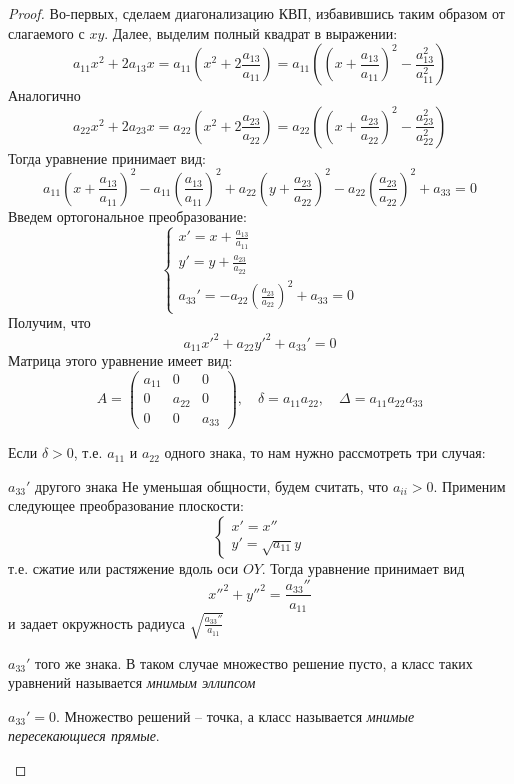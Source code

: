 \begin{proof}
	Во-первых, сделаем диагонализацию КВП, избавившись таким образом от слагаемого с $xy$.
	Далее, выделим полный квадрат в выражении:
	\[a_{11} x^2 + 2a_{13} x = a_{11} \left(x^2 + 2 \frac{a_{13}}{a_{11}}\right) = a_{11} \left(\left(x + \frac{a_{13}}{a_{11}}\right)^2 - \frac{a_{13}^2}{a_{11}^2}\right)\]
	Аналогично
	\[a_{22} x^2 + 2a_{23} x = a_{22} \left(x^2 + 2 \frac{a_{23}}{a_{22}}\right) = a_{22} \left(\left(x + \frac{a_{23}}{a_{22}}\right)^2 - \frac{a_{23}^2}{a_{22}^2}\right)\]
	Тогда уравнение принимает вид:
	\[a_{11} \left(x + \frac{a_{13}}{a_{11}}\right)^2 - a_{11} \left(\frac{a_{13}}{a_{11}}\right)^2 + a_{22} \left(y + \frac{a_{23}}{a_{22}}\right)^2 - a_{22} \left(\frac{a_{23}}{a_{22}}\right)^2 + a_{33} = 0\]
	Введем ортогональное преобразование:
	\[\begin{cases}
		x' = x + \frac{a_{13}}{a_{11}} \\
		y' = y + \frac{a_{23}}{a_{22}} \\
		a_{33}' = -a_{22} \left(\frac{a_{23}}{a_{22}}\right)^2 + a_{33} = 0
	\end{cases}\]
	Получим, что
	\[a_{11} x'^2 + a_{22} y'^2 + a_{33}' = 0\]
	Матрица этого уравнение имеет вид:
	\[A = \left(\begin{array}{ccc}
	a_{11} & 0 & 0 \\ 
	0 & a_{22} & 0 \\ 
	0 & 0 & a_{33}
	\end{array}\right), \quad \delta = a_{11} a_{22}, \quad \Delta = a_{11} a_{22} a_{33}\]

	Если $\delta > 0$, т.е. $a_{11}$ и $a_{22}$ одного знака, то нам нужно рассмотреть три случая:
	\begin{MyList}
		\item $a_{33}'$ другого знака
		Не уменьшая общности, будем считать, что $a_{ii} > 0$. Применим следующее преобразование плоскости:
		\[\begin{cases}
			x' = x'' \\
			y' = \sqrt{a_{11}} y
		\end{cases}\]
		т.е. сжатие или растяжение вдоль оси $OY$.
		Тогда уравнение принимает вид
		\[x''^2 + y''^2 = \frac{a_{33}''}{a_{11}}\]
		и задает окружность радиуса $\sqrt{ \frac{a_{33}''}{a_{11}}}$ 
		\begin{figure}[H]
			\centering
			\def\svgwidth{.35\columnwidth}
			
		\end{figure}
		\item $a_{33}'$ того же знака. В таком случае множество решение пусто, а класс таких уравнений называется \textit{мнимым эллипсом}
		\item $a_{33}' = 0$.  Множество решений -- точка, а класс называется \textit{мнимые пересекающиеся прямые}. 
	\end{MyList}


\end{proof}
